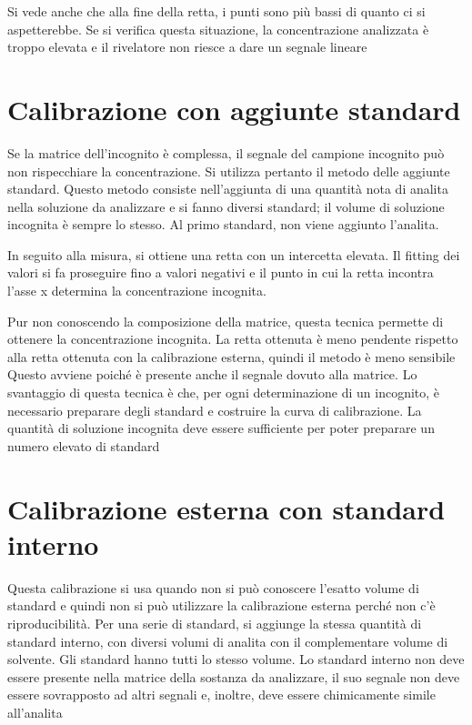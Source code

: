 Si vede anche che alla fine della retta, i punti sono più bassi di quanto ci si aspetterebbe.
Se si verifica questa situazione, la concentrazione analizzata è troppo elevata e il rivelatore non riesce a dare un segnale lineare

\section{Calibrazione con aggiunte standard}
Se la matrice dell'incognito è complessa, il segnale del campione incognito può non rispecchiare la concentrazione. Si utilizza pertanto il metodo delle aggiunte standard.
Questo metodo consiste nell'aggiunta di una quantità nota di analita nella soluzione da analizzare e si fanno diversi standard; il volume di soluzione incognita è sempre lo stesso.
Al primo standard, non viene aggiunto l'analita.

In seguito alla misura, si ottiene una retta con un intercetta elevata.
Il fitting dei valori si fa proseguire fino a valori negativi e il punto in cui la retta incontra l'asse x determina la concentrazione incognita.


Pur non conoscendo la composizione della matrice, questa tecnica permette di ottenere la concentrazione incognita.
La retta ottenuta è meno pendente rispetto alla retta ottenuta con la calibrazione esterna, quindi il metodo è meno sensibile
Questo avviene poiché è presente anche il segnale dovuto alla matrice.
Lo svantaggio di questa tecnica è che, per ogni determinazione di un incognito, è necessario preparare degli standard e costruire la curva di calibrazione.
La quantità di soluzione incognita deve essere sufficiente per poter preparare un numero elevato di standard

\section{Calibrazione esterna con standard interno}
Questa calibrazione si usa quando non si può conoscere l'esatto volume di standard e quindi non si può utilizzare la calibrazione esterna perché non c'è riproducibilità.
Per una serie di standard, si aggiunge la stessa quantità di standard interno, con diversi volumi di analita con il complementare volume di solvente. Gli standard hanno tutti lo stesso volume.
Lo standard interno non deve essere presente nella matrice della sostanza da analizzare, il suo segnale non deve essere sovrapposto ad altri segnali e, inoltre, deve essere chimicamente simile all'analita

